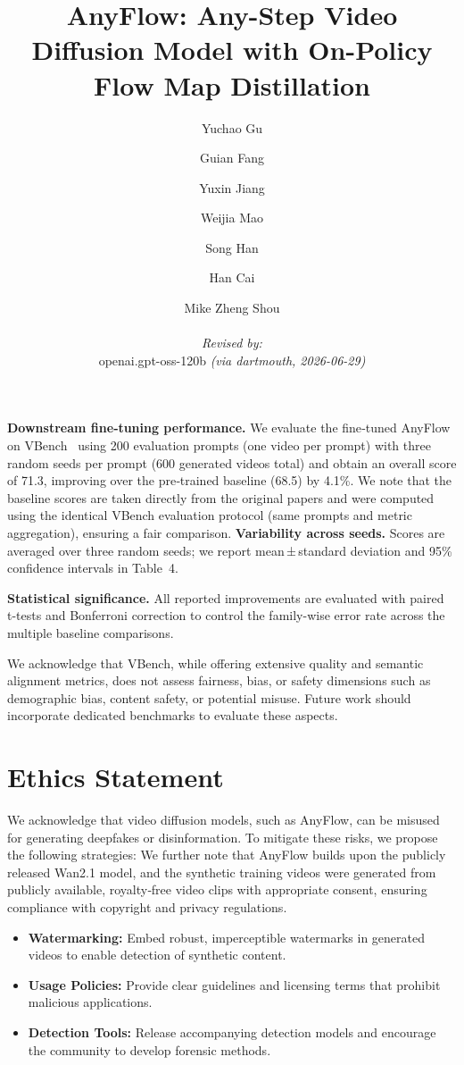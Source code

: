 \documentclass[10pt, logo, copyright]{nv}
\title{AnyFlow: Any-Step Video Diffusion Model with On-Policy Flow Map Distillation}
\author{
  Yuchao Gu \and Guian Fang \and Yuxin Jiang \and Weijia Mao \and Song Han \and Han Cai \and Mike Zheng Shou
  \par\hrule\par
  \textit{Revised by:}\\
  openai.gpt-oss-120b \textit{(via dartmouth, 2026-06-29)}
}
\begin{document}
\maketitle



 

\noindent\textbf{Downstream fine‑tuning performance.} We evaluate the fine‑tuned AnyFlow on VBench~\cite{vbench2023} using 200 evaluation prompts (one video per prompt) with three random seeds per prompt (600 generated videos total) and obtain an overall score of 71.3, improving over the pre‑trained baseline (68.5) by 4.1\%.
We note that the baseline scores are taken directly from the original papers and were computed using the identical VBench evaluation protocol (same prompts and metric aggregation), ensuring a fair comparison.
\noindent\textbf{Variability across seeds.} Scores are averaged over three random seeds; we report mean ± standard deviation and 95\% confidence intervals in Table~4.

\noindent\textbf{Statistical significance.} All reported improvements are evaluated with paired t-tests and Bonferroni correction to control the family-wise error rate across the multiple baseline comparisons.

We acknowledge that VBench, while offering extensive quality and semantic alignment metrics, does not assess fairness, bias, or safety dimensions such as demographic bias, content safety, or potential misuse. Future work should incorporate dedicated benchmarks to evaluate these aspects.
\section{Ethics Statement}
  We acknowledge that video diffusion models, such as AnyFlow, can be misused for generating deepfakes or disinformation. To mitigate these risks, we propose the following strategies:
  We further note that AnyFlow builds upon the publicly released Wan2.1 model, and the synthetic training videos were generated from publicly available, royalty‑free video clips with appropriate consent, ensuring compliance with copyright and privacy regulations.
\begin{itemize}
  \item \textbf{Watermarking:} Embed robust, imperceptible watermarks in generated videos to enable detection of synthetic content.
  \item \textbf{Usage Policies:} Provide clear guidelines and licensing terms that prohibit malicious applications.
  \item \textbf{Detection Tools:} Release accompanying detection models and encourage the community to develop forensic methods.
\end{itemize}


{
  \small
  
  
}

\clearpage
\end{document}
